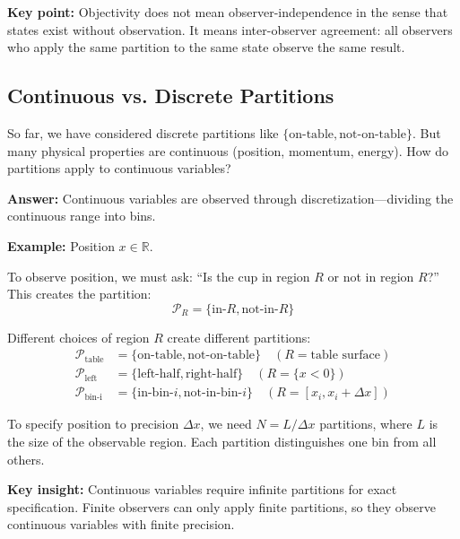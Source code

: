 \documentclass[twocolumn,10pt]{article}
\theoremstyle{definition}
\theoremstyle{remark}
\begin{document}
\vspace{0.2cm}
\noindent\textbf{Key point:} Objectivity does not mean observer-independence in the sense that states exist without observation. It means inter-observer agreement: all observers who apply the same partition to the same state observe the same result.

\subsection{Continuous vs. Discrete Partitions}

So far, we have considered discrete partitions like $\{\text{on-table}, \text{not-on-table}\}$. But many physical properties are continuous (position, momentum, energy). How do partitions apply to continuous variables?

\vspace{0.2cm}
\noindent\textbf{Answer:} Continuous variables are observed through discretization—dividing the continuous range into bins.

\vspace{0.2cm}
\noindent\textbf{Example:} Position $x \in \mathbb{R}$.

To observe position, we must ask: ``Is the cup in region $R$ or not in region $R$?'' This creates the partition:
\begin{equation}
\mathcal{P}_R = \{\text{in-}R, \text{not-in-}R\}
\end{equation}

\noindent Different choices of region $R$ create different partitions:
\begin{align}
\mathcal{P}_{\text{table}} &= \{\text{on-table}, \text{not-on-table}\} \quad (R = \text{table surface}) \\
\mathcal{P}_{\text{left}} &= \{\text{left-half}, \text{right-half}\} \quad (R = \{x < 0\}) \\
\mathcal{P}_{\text{bin-i}} &= \{\text{in-bin-}i, \text{not-in-bin-}i\} \quad (R = [x_i, x_i + \Delta x])
\end{align}

\noindent To specify position to precision $\Delta x$, we need $N = L/\Delta x$ partitions, where $L$ is the size of the observable region. Each partition distinguishes one bin from all others.

\vspace{0.2cm}
\noindent\textbf{Key insight:} Continuous variables require infinite partitions for exact specification. Finite observers can only apply finite partitions, so they observe continuous variables with finite precision.
\end{document}
